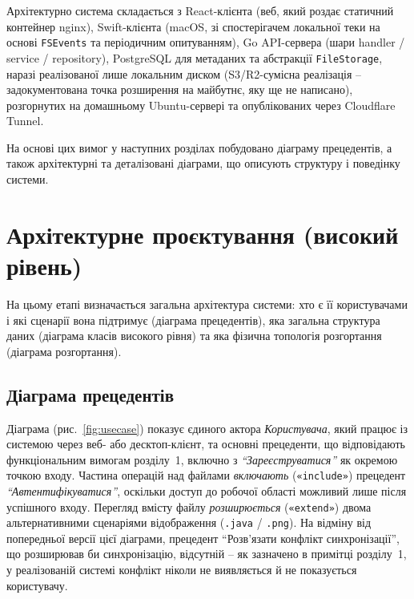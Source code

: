 \documentclass[12pt,a4paper]{article}
\begin{document}
Архітектурно система складається з React-клієнта (веб, який роздає статичний контейнер nginx), Swift-клієнта (macOS, зі спостерігачем локальної теки на основі \texttt{FSEvents} та періодичним опитуванням), Go API-сервера (шари handler / service / repository), PostgreSQL для метаданих та абстракції \texttt{FileStorage}, наразі реалізованої лише локальним диском (S3/R2-сумісна реалізація -- задокументована точка розширення на майбутнє, яку ще не написано), розгорнутих на домашньому Ubuntu-сервері та опублікованих через Cloudflare Tunnel.

На основі цих вимог у наступних розділах побудовано діаграму прецедентів, а також архітектурні та деталізовані діаграми, що описують структуру і поведінку системи.

\section{Архітектурне проєктування (високий рівень)}

На цьому етапі визначається загальна архітектура системи: хто є її користувачами і які сценарії вона підтримує (діаграма прецедентів), яка загальна структура даних (діаграма класів високого рівня) та яка фізична топологія розгортання (діаграма розгортання).

\subsection{Діаграма прецедентів}

Діаграма (рис.~\ref{fig:usecase}) показує єдиного актора \emph{Користувача}, який працює із системою через веб- або десктоп-клієнт, та основні прецеденти, що відповідають функціональним вимогам розділу~1, включно з \emph{``Зареєструватися''} як окремою точкою входу. Частина операцій над файлами \emph{включають} (\texttt{«include»}) прецедент \emph{``Автентифікуватися''}, оскільки доступ до робочої області можливий лише після успішного входу. Перегляд вмісту файлу \emph{розширюється} (\texttt{«extend»}) двома альтернативними сценаріями відображення (\texttt{.java} / \texttt{.png}). На відміну від попередньої версії цієї діаграми, прецедент ``Розв'язати конфлікт синхронізації'', що розширював би синхронізацію, відсутній -- як зазначено в примітці розділу~1, у реалізованій системі конфлікт ніколи не виявляється й не показується користувачу.
\end{document}
